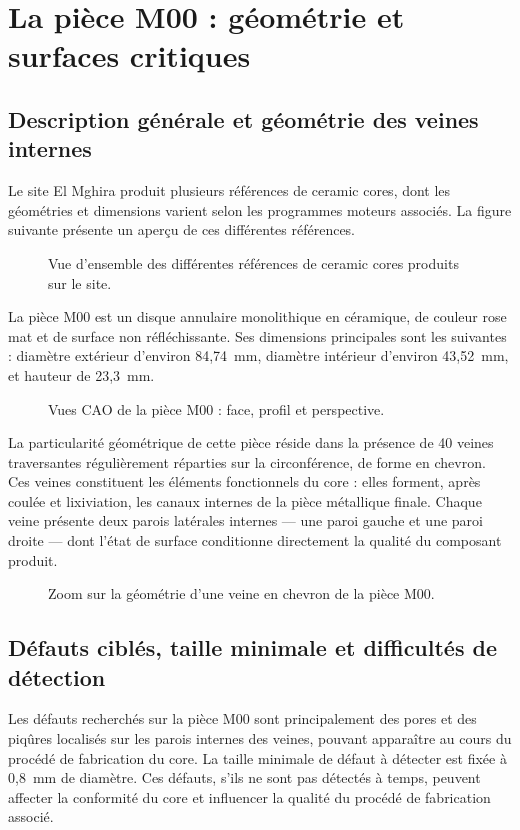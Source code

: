 \section{La pièce M00 : géométrie et surfaces critiques}

\subsection{Description générale et géométrie des veines internes}
Le site El Mghira produit plusieurs références de ceramic cores, dont les géométries 
et dimensions varient selon les programmes moteurs associés. La figure suivante 
présente un aperçu de ces différentes références.
\begin{figure}[H]
\centering
{}
\caption{Vue d'ensemble des différentes références de ceramic cores produits sur le site.}
\label{fig:refs_cores}
\end{figure}

La pièce M00 est un disque annulaire monolithique en céramique, de couleur rose mat et
de surface non réfléchissante. Ses dimensions principales sont les suivantes : diamètre
extérieur d'environ 84,74~mm, diamètre intérieur d'environ 43,52~mm, et hauteur de
23,3~mm.

\begin{figure}[H]
\centering
{}
\caption{Vues CAO de la pièce M00 : face, profil et perspective.}
\label{fig:cao_m00}
\end{figure}

La particularité géométrique de cette pièce réside dans la présence de 40 veines
traversantes régulièrement réparties sur la circonférence, de forme en chevron. Ces
veines constituent les éléments fonctionnels du core : elles forment, après coulée et
lixiviation, les canaux internes de la pièce métallique finale. Chaque veine présente
deux parois latérales internes --- une paroi gauche et une paroi droite --- dont l'état
de surface conditionne directement la qualité du composant produit.

\begin{figure}[H]
\centering
{}
\caption{Zoom sur la géométrie d'une veine en chevron de la pièce M00.}
\label{fig:veine_chevron}
\end{figure}

\subsection{Défauts ciblés, taille minimale et difficultés de détection}
Les défauts recherchés sur la pièce M00 sont principalement des pores et des piqûres
localisés sur les parois internes des veines, pouvant apparaître au cours du procédé de
fabrication du core. La taille minimale de défaut à détecter est fixée à 0,8~mm de
diamètre. Ces défauts, s'ils ne sont pas détectés à temps, peuvent affecter la conformité
du core et influencer la qualité du procédé de fabrication associé.

